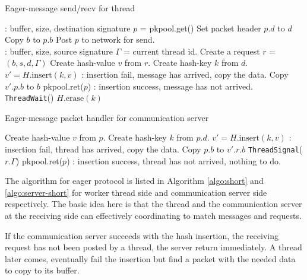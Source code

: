 \documentclass[11pt]{article}
\begin{document}
\begin{algorithm}
  \caption{Eager-message send/recv for thread}
  \label{algo:short}
  \begin{algorithmic}[1] %
     \Comment: buffer, size, destination signature 
      \State $p$ = pkpool.get()
      \State Set packet header $p.d$ to $d$
      \State Copy $b$ to $p.b$
      \State Post $p$ to network for send.
    \EndProcedure
    \\
     \Comment: buffer, size, source signature 
      \State $\Gamma$ = current thread id.
      \State Create a request $r$ = $(b,s,d,\Gamma)$
      \State Create hash-value $v$ from $r$.
      \State Create hash-key $k$ from $d$.
      \State $v' = H.\text{insert}(k,v)$
        \Comment: insertion fail, message has arrived, copy the data.
        \State Copy $v'.p.b$ to $b$
        \State pkpool.ret($p$)
      \Else
        \Comment: insertion success, message has not arrived.
        \State \texttt{ThreadWait}()
      \EndIf
      \State $H.\text{erase}(k)$
    \EndProcedure
  \end{algorithmic}
\end{algorithm}

\begin{algorithm}
  \caption{Eager-message packet handler for communication server}
  \label{algo:server-short}
  \begin{algorithmic}[1]
      \State Create hash-value $v$ from $p$.
      \State Create hash-key $k$ from $p.d$.
      \State $v' = H.\text{insert}(k,v)$
        \Comment: insertion fail, thread has arrived, copy the data.
        \State Copy $p.b$ to $v'.r.b$
        \State \texttt{ThreadSignal}($r.\Gamma$)
        \State pkpool.ret($p$)
      \Else
        \Comment: insertion success, thread has not arrived, nothing to do.
        \State \Return
      \EndIf
    \EndProcedure
  \end{algorithmic}
\end{algorithm}

The algorithm for eager protocol is listed in Algorithm \ref{algo:short} and
\ref{algo:server-short} for worker thread side and communication server side
respectively. The basic idea here is that the thread and the communication
server at the receiving side can effectively coordinating to match messages and
requests.

If the communication server succeeds with the hash insertion, the receiving
request has not been posted by a thread, the server return immediately. A
thread later comes, eventually fail the insertion but find a packet
with the needed data to copy to its buffer.
\end{document}

